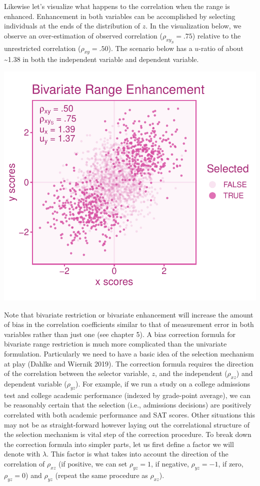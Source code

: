 \documentclass[
  letterpaper,
  DIV=11,
  numbers=noendperiod]{scrreprt}
\begin{document}
Likewise let's visualize what happens to the correlation when the range
is enhanced. Enhancement in both variables can be accomplished by
selecting individuals at the ends of the distribution of \(z\). In the
visualization below, we observe an over-estimation of observed
correlation (\(\rho_{xy_S}=.75\)) relative to the unrestricted
correlation (\(\rho_{xy}=.50\)). The scenario below has a \(u\)-ratio of
about \textasciitilde1.38 in both the independent variable and dependent
variable.

\includegraphics{indirect_range_restriction_files/figure-pdf/unnamed-chunk-6-1.pdf}

Note that bivariate restriction or bivariate enhancement will increase
the amount of bias in the correlation coefficients similar to that of
measurement error in both variables rather than just one (see chapter
5). A bias correction formula for bivariate range restriction is much
more complicated than the univariate formulation. Particularly we need
to have a basic idea of the selection mechanism at play (Dahlke and
Wiernik 2019). The correction formula requires the direction of the
correlation between the selector variable, \(z\), and the independent
(\(\rho_{xz}\)) and dependent variable (\(\rho_{yz}\)). For example, if
we run a study on a college admissions test and college academic
performance (indexed by grade-point average), we can be reasonably
certain that the selection (i.e., admissions decisions) are positively
correlated with both academic performance and SAT scores. Other
situations this may not be as straight-forward however laying out the
correlational structure of the selection mechanism is vital step of the
correction procedure. To break down the correction formula into simpler
parts, let us first define a factor we will denote with \(\lambda\).
This factor is what takes into account the direction of the correlation
of \(\rho_{xz}\) (if positive, we can set \(\rho_{yz}=1\), if negative,
\(\rho_{yz}=-1\), if zero, \(\rho_{yz}=0\)) and \(\rho_{yz}\) (repeat
the same procedure as \(\rho_{xz}\)).
\end{document}
